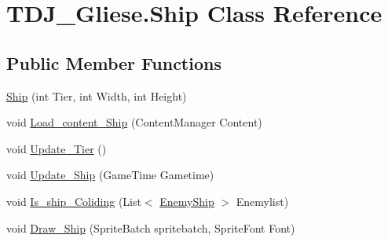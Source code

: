 \hypertarget{class_t_d_j___gliese_1_1_ship}{}\section{T\+D\+J\+\_\+\+Gliese.\+Ship Class Reference}
\label{class_t_d_j___gliese_1_1_ship}
\subsection*{Public Member Functions}
\begin{DoxyCompactItemize}
\item 
\hyperlink{class_t_d_j___gliese_1_1_ship_ac6484a415970f8daa937d940aef48a57}{Ship} (int Tier, int Width, int Height)
\item 
void \hyperlink{class_t_d_j___gliese_1_1_ship_a19964ca50d3961a08f414d8deca7291c}{Load\+\_\+content\+\_\+\+Ship} (Content\+Manager Content)
\item 
void \hyperlink{class_t_d_j___gliese_1_1_ship_a363f5776505f9baf33ae8651547f6ff8}{Update\+\_\+\+Tier} ()
\item 
void \hyperlink{class_t_d_j___gliese_1_1_ship_a30aa20d3d1fbb797eedb19deffd5da72}{Update\+\_\+\+Ship} (Game\+Time Gametime)
\item 
void \hyperlink{class_t_d_j___gliese_1_1_ship_ade17691846d292b3e780c5667a9cc5ee}{Is\+\_\+ship\+\_\+\+Coliding} (List$<$ \hyperlink{class_t_d_j___gliese_1_1_enemy_ship}{Enemy\+Ship} $>$ Enemylist)
\item 
void \hyperlink{class_t_d_j___gliese_1_1_ship_aa2cb84ed2f07f47eadc04e86a0fb77c1}{Draw\+\_\+\+Ship} (Sprite\+Batch spritebatch, Sprite\+Font Font)
\end{DoxyCompactItemize}

